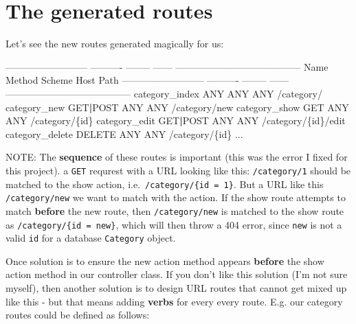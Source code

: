 \documentclass[a4paperpaper,openright]{book}
\newenvironment{Shaded}{}{}
\newcommand{\DataTypeTok}[1]{\textcolor[rgb]{0.56,0.13,0.00}{#1}}
\newcommand{\ExtensionTok}[1]{#1}
\newcommand{\KeywordTok}[1]{\textcolor[rgb]{0.00,0.44,0.13}{\textbf{#1}}}
\newcommand{\NormalTok}[1]{#1}
\begin{document}
\hypertarget{the-generated-routes}{%
\section{The generated routes}\label{the-generated-routes}}

Let's see the new routes generated magically for us:

\begin{Shaded}
\begin{Highlighting}[]
     \ExtensionTok{--------------------------}\NormalTok{ ---------- -------- ------ ---------------------------------------}
      \ExtensionTok{Name}\NormalTok{                       Method     Scheme   Host   Path}
     \ExtensionTok{--------------------------}\NormalTok{ ---------- -------- ------ ---------------------------------------}
      \ExtensionTok{category_index}\NormalTok{             ANY        ANY      ANY    /category/}
      \ExtensionTok{category_new}\NormalTok{               GET}\KeywordTok{|}\ExtensionTok{POST}\NormalTok{   ANY      ANY    /category/new}
      \ExtensionTok{category_show}\NormalTok{              GET        ANY      ANY    /category/}\DataTypeTok{\{id\}}
      \ExtensionTok{category_edit}\NormalTok{              GET}\KeywordTok{|}\ExtensionTok{POST}\NormalTok{   ANY      ANY    /category/}\DataTypeTok{\{id\}}\NormalTok{/edit}
      \ExtensionTok{category_delete}\NormalTok{            DELETE     ANY      ANY    /category/}\DataTypeTok{\{id\}}
      \ExtensionTok{...}
\end{Highlighting}
\end{Shaded}

NOTE: The \textbf{sequence} of these routes is important (this was the
error I fixed for this project). a \texttt{GET} requrest with a URL
looking like this: \texttt{/category/1} should be matched to the show
action, i.e.~\texttt{/category/\{id\ =\ 1\}}. But a URL like this
\texttt{/category/new} we want to match with the action. If the show
route attempts to match \textbf{before} the new route, then
\texttt{/category/new} is matched to the show route as
\texttt{/category/\{id\ =\ new\}}, which will then throw a 404 error,
since \texttt{new} is not a valid \texttt{id} for a database
\texttt{Category} object.

Once solution is to ensure the new action method appears \textbf{before}
the show action method in our controller class. If you don't like this
solution (I'm not sure myself), then another solution is to design URL
routes that cannot get mixed up like this - but that means adding
\textbf{verbs} for every every route. E.g. our category routes could be
defined as follows:
\end{document}
